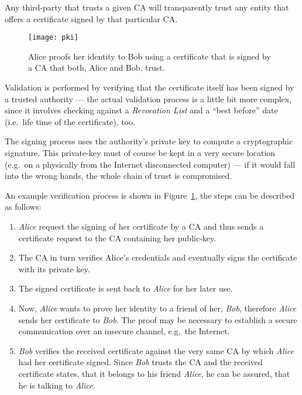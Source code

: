 Any third-party that trusts a given CA will transparently trust any entity
that offers a certificate signed by that particular CA.

\begin{figure}[h]
  \centering
  \texttt{[image: pki]}
  \caption[Public  Key Infrastructure]{Alice  proofs her  identity  to Bob
    using a certificate  that is signed by a CA that  both, Alice and Bob,
    trust.}
  \label{fig:pki}
\end{figure}

Validation is performed by verifying  that the certificate itself has been
signed  by a  trusted authority  --- the  actual validation  process  is a
little   bit  more  complex,   since  it   involves  checking   against  a
\emph{Revocation List} and  a ``best before'' date (i.e.~life  time of the
certificate), too.

The  signing  process  uses  the  authority's private  key  to  compute  a
cryptographic signature. This private-key must of course be kept in a very
secure  location  (e.g.~on a  physically  from  the Internet  disconnected
computer) ---  if it would fall into  the wrong hands, the  whole chain of
trust is compromised.

An  example verification  process  is shown  in Figure~\ref{fig:pki},  the
steps can be described as follows:
\begin{enumerate}
\item \emph{Alice} request the signing of her certificate by a CA and thus
  sends a certificate request to the CA containing her public-key.
\item The CA in turn verifies Alice's credentials and eventually signs the
  certificate with its private key.
\item The signed certificate is sent back to \emph{Alice} for her later use.
\item Now,  \emph{Alice} wants to prove  her identity to a  friend of her,
  \emph{Bob},   therefore   \emph{Alice}    sends   her   certificate   to
  \emph{Bob}.  The   proof  may  be   necessary  to  establish   a  secure
  communication over an insecure channel, e.g.~the Internet.
\item \emph{Bob}  verifies the received certificate against  the very same
  CA by  which \emph{Alice} had her certificate  signed.  Since \emph{Bob}
  trusts the  CA and the received  certificate states, that  it belongs to
  his  friend \emph{Alice},  he  can be  assured,  that he  is talking  to
  \emph{Alice}.
\end{enumerate}

